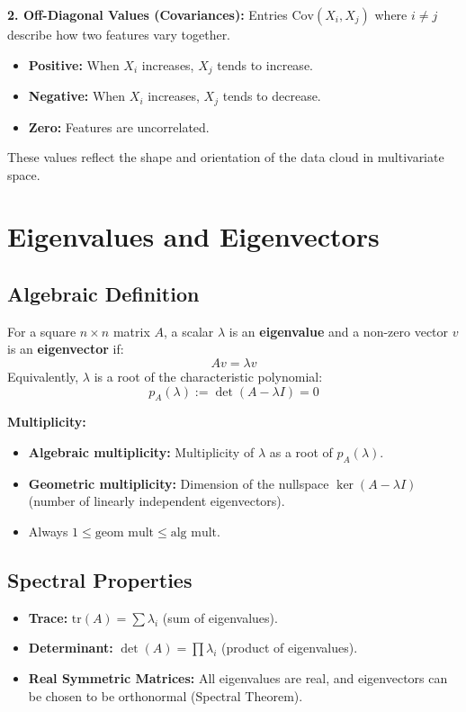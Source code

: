 \documentclass[12pt, a4paper]{report}
\begin{document}
\textbf{2. Off-Diagonal Values (Covariances):}
Entries $\text{Cov}(X_i, X_j)$ where $i \neq j$ describe how two features vary together.
\begin{itemize}
    \item \textbf{Positive:} When $X_i$ increases, $X_j$ tends to increase.
    \item \textbf{Negative:} When $X_i$ increases, $X_j$ tends to decrease.
    \item \textbf{Zero:} Features are uncorrelated.
\end{itemize}
These values reflect the shape and orientation of the data cloud in multivariate space.

\section{Eigenvalues and Eigenvectors}

\subsection{Algebraic Definition}
For a square $n \times n$ matrix $A$, a scalar $\lambda$ is an \textbf{eigenvalue} and a non-zero vector $v$ is an \textbf{eigenvector} if:
\begin{equation}
    Av = \lambda v
\end{equation}
Equivalently, $\lambda$ is a root of the characteristic polynomial:
\[ p_A(\lambda) := \det(A - \lambda I) = 0 \]

\textbf{Multiplicity:}
\begin{itemize}
    \item \textbf{Algebraic multiplicity:} Multiplicity of $\lambda$ as a root of $p_A(\lambda)$.
    \item \textbf{Geometric multiplicity:} Dimension of the nullspace $\ker(A - \lambda I)$ (number of linearly independent eigenvectors).
    \item Always $1 \leq \text{geom mult} \leq \text{alg mult}$.
\end{itemize}

\subsection{Spectral Properties}
\begin{itemize}
    \item \textbf{Trace:} $\text{tr}(A) = \sum \lambda_i$ (sum of eigenvalues).
    \item \textbf{Determinant:} $\det(A) = \prod \lambda_i$ (product of eigenvalues).
    \item \textbf{Real Symmetric Matrices:} All eigenvalues are real, and eigenvectors can be chosen to be orthonormal (Spectral Theorem).
\end{itemize}
\end{document}
